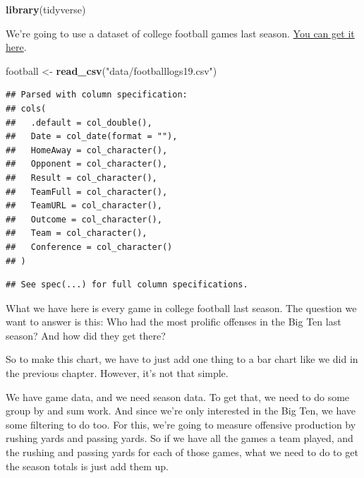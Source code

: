 \documentclass[
]{book}
\newenvironment{Shaded}{\begin{snugshade}}{\end{snugshade}}
\newcommand{\DataTypeTok}[1]{\textcolor[rgb]{0.13,0.29,0.53}{#1}}
\newcommand{\KeywordTok}[1]{\textcolor[rgb]{0.13,0.29,0.53}{\textbf{#1}}}
\newcommand{\NormalTok}[1]{#1}
\newcommand{\OperatorTok}[1]{\textcolor[rgb]{0.81,0.36,0.00}{\textbf{#1}}}
\newcommand{\StringTok}[1]{\textcolor[rgb]{0.31,0.60,0.02}{#1}}
\begin{document}
\begin{Shaded}
\begin{Highlighting}[]
\KeywordTok{library}\NormalTok{(tidyverse)}
\end{Highlighting}
\end{Shaded}

We're going to use a dataset of college football games last season. \href{https://unl.box.com/s/2prgq48ctoxlukn6kmfjw0u1opda5s0m}{You can get it here}.

\begin{Shaded}
\begin{Highlighting}[]
\NormalTok{football <-}\StringTok{ }\KeywordTok{read_csv}\NormalTok{(}\StringTok{"data/footballlogs19.csv"}\NormalTok{)}
\end{Highlighting}
\end{Shaded}

\begin{verbatim}
## Parsed with column specification:
## cols(
##   .default = col_double(),
##   Date = col_date(format = ""),
##   HomeAway = col_character(),
##   Opponent = col_character(),
##   Result = col_character(),
##   TeamFull = col_character(),
##   TeamURL = col_character(),
##   Outcome = col_character(),
##   Team = col_character(),
##   Conference = col_character()
## )
\end{verbatim}

\begin{verbatim}
## See spec(...) for full column specifications.
\end{verbatim}

What we have here is every game in college football last season. The question we want to answer is this: Who had the most prolific offenses in the Big Ten last season? And how did they get there?

So to make this chart, we have to just add one thing to a bar chart like we did in the previous chapter. However, it's not that simple.

We have game data, and we need season data. To get that, we need to do some group by and sum work. And since we're only interested in the Big Ten, we have some filtering to do too. For this, we're going to measure offensive production by rushing yards and passing yards. So if we have all the games a team played, and the rushing and passing yards for each of those games, what we need to do to get the season totals is just add them up.

\begin{Shaded}
\end{Shaded}
\end{document}
